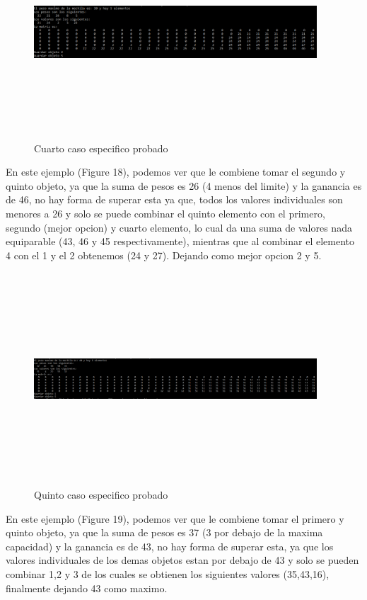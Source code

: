 \documentclass[spanish]{article}
\begin{document}
 		\begin{figure}[H]
 			\centering
 			\includegraphics[width=400px,height=300px]{casoEspecifico4}
 			\caption{Cuarto caso especifico probado}
 		\end{figure}
	 	En este ejemplo (Figure 18), podemos ver que le combiene tomar el segundo y quinto objeto, ya que la suma de pesos es 26 (4 menos del limite) y la ganancia es de 46, no hay forma de superar esta ya que, todos los valores individuales son menores a 26 y solo se puede combinar el quinto elemento con el primero, segundo (mejor opcion) y cuarto elemento, lo cual da una suma de valores nada equiparable (43, 46 y 45 respectivamente), mientras que al combinar el elemento 4 con el 1 y el 2 obtenemos (24 y 27). Dejando como mejor opcion 2 y 5.
 		\begin{figure}[H]
 			\centering
 			\includegraphics[width=400px,height=300px]{casoEspecifico5}
 			\caption{Quinto caso especifico probado}
 		\end{figure}
 		En este ejemplo (Figure 19), podemos ver que le combiene tomar el primero y quinto objeto, ya que la suma de pesos es 37 (3 por debajo de la maxima capacidad) y la ganancia es de 43, no hay forma de superar esta, ya que los valores individuales de los demas objetos estan por debajo de 43 y solo se pueden combinar 1,2 y 3 de los cuales se obtienen los siguientes valores (35,43,16), finalmente dejando 43 como maximo.\\
\end{document}
